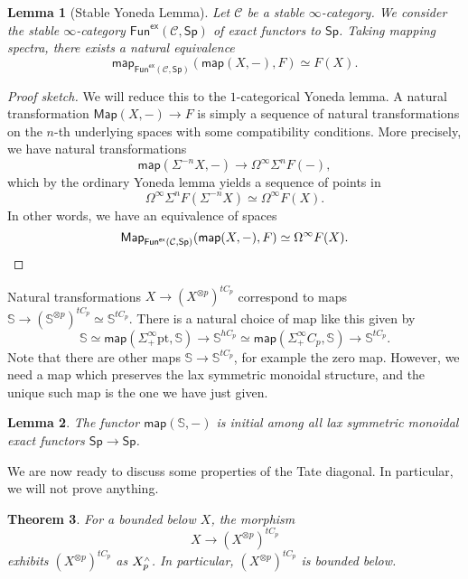 \documentclass[10pt, oneside]{memoir}
\newtheorem{thm}{Theorem}[subsection]
\newtheorem{lem}[thm]{Lemma}
\theoremstyle{definition}
\theoremstyle{remark}
\theoremstyle{plain}
\theoremstyle{definition}
\theoremstyle{remark}
\newcommand{\bS}{\mathbb{S}}
\newcommand{\mc}[1]{\mathcal{#1}}
\newcommand{\mr}[1]{\mathrm{#1}}
\newcommand{\ms}[1]{\mathsf{#1}}
\newcommand{\1}{\mathbf{1}}
\newcommand{\2}{\mathbf{2}}
\newcommand{\3}{\mathbf{3}}
\newcommand{\pt}{\mr{pt}}
\newcommand{\sw}{\mathsmaller{\wedge}}
\begin{document}
\begin{lem}[Stable Yoneda Lemma]
    Let $\mc{C}$ be a stable $\infty$-category. We consider the stable $\infty$-category $\ms{Fun}^{\ms{ex}}(\mc{C}, \ms{Sp})$ of exact functors to $\ms{Sp}$. Taking mapping spectra, there exists a natural equivalence
    \[ \ms{map}_{\ms{Fun}^{\ms{ex}}(\mc{C}, \ms{Sp})} (\ms{map}(X, -), F) \simeq F(X). \]
\end{lem}

\begin{proof}[Proof sketch]
    We will reduce this to the $1$-categorical Yoneda lemma. A natural transformation $\ms{Map}(X, -) \to F$ is simply a sequence of natural transformations on the $n$-th underlying spaces with some compatibility conditions. More precisely, we have natural transformations
    \[ \ms{map}(\Sigma^{-n} X, -) \to \Omega^{\infty} \Sigma^n F(-), \]
    which by the ordinary Yoneda lemma yields a sequence of points in 
    \[ \Omega^{\infty} \Sigma^n F(\Sigma^{-n} X)  \simeq \Omega^{\infty} F(X). \]
    In other words, we have an equivalence of spaces
    \[ \ms{Map}_{\ms{Fun}^{\ms{ex}}(\mc{C}, \ms{Sp})} (\ms{map}(X, -), F) \simeq \Omega^{\infty} F(X). \qedhere \]
\end{proof}

Natural transformations $X \to (X^{\otimes p})^{t C_p}$ correspond to maps $\bS \to (\bS^{\otimes p})^{t C_p} \simeq \bS^{t C_p}$. There is a natural choice of map like this given by
\[ \bS \simeq \ms{map}(\Sigma_+^{\infty} \pt, \bS) \to \bS^{h C_p} \simeq \ms{map}(\Sigma_+^{\infty} C_p, \bS) \to \bS^{t C_p}. \]
Note that there are other maps $\bS \to \bS^{t C_p}$, for example the zero map. However, we need a map which preserves the lax symmetric monoidal structure, and the unique such map is the one we have just given.

\begin{lem}
    The functor $\ms{map}(\bS, -)$ is initial among all lax symmetric monoidal exact functors $\ms{Sp} \to \ms{Sp}$.
\end{lem}

We are now ready to discuss some properties of the Tate diagonal. In particular, we will not prove anything.

\begin{thm}
    For a bounded below $X$, the morphism
    \[ X \to (X^{\otimes p})^{t C_p} \]
    exhibits $(X^{\otimes p})^{t C_p}$ as $X_p^{\sw}$. In particular, $(X^{\otimes p})^{t C_p}$ is bounded below.
\end{thm}
\end{document}

